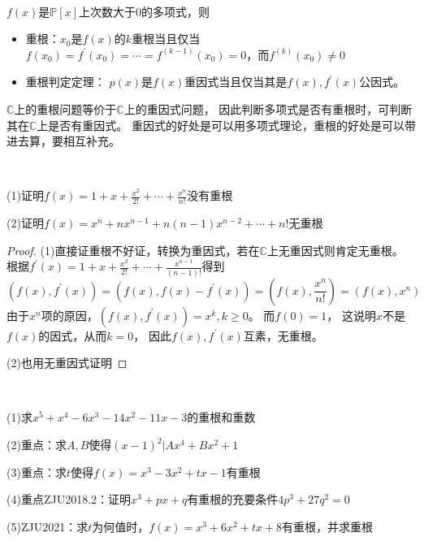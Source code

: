 ~

\begin{theorem}[重根性质汇总]
  $f(x)$是$\mathbb{P}[x]$上次数大于$0$的多项式，则
  \begin{itemize}
  \item 重根：$x_0$是$f(x)$的$k$重根当且仅当$f(x_0) = f^{\prime}(x_0) = \cdots = f^{(k-1)}(x_0) = 0$，而$f^{(k)}(x_0) \neq 0$
  \item 重根判定定理：
    $p(x)$是$f(x)$重因式当且仅当其是$f(x),f^{\prime}(x)$公因式。
  \end{itemize}
\end{theorem}

\begin{note}
  $\mathbb{C}$上的重根问题等价于$\mathbb{C}$上的重因式问题，
  因此判断多项式是否有重根时，可判断其在$\mathbb{C}$上是否有重因式。
  重因式的好处是可以用多项式理论，重根的好处是可以带进去算，要相互补充。
\end{note}



~

\begin{exercise}[判定重根存在性]
  (1)证明$f(x) = 1 + x + \frac{x^2}{2!} + \cdots + \frac{x^n}{n!}$没有重根

  (2)证明$f(x) = x^n + nx^{n-1} + n(n-1)x^{n-2} + \cdots + n!$无重根
\end{exercise}

\begin{proof}
  (1)直接证重根不好证，转换为重因式，若在$\mathbb{C}$上无重因式则肯定无重根。
  根据$f^{\prime}(x) = 1 + x + \frac{x^2}{2!} + \cdots + \frac{x^{n-1}}{(n-1)!}$得到
  \begin{equation*}
    (f(x),f^{\prime}(x)) = (f(x),f(x) - f^{\prime}(x)) = (f(x),\frac{x^n}{n!}) = (f(x),x^n) 
  \end{equation*}
  由于$x^n$项的原因，$(f(x),f^{\prime}(x)) = x^k, k \geq 0$。
  而$f(0) = 1$，
  这说明$x$不是$f(x)$的因式，从而$k = 0$，
  因此$f(x),f^{\prime}(x)$互素，无重根。

  (2)也用无重因式证明
\end{proof}



~

\begin{exercise}[重根、重因式相互转化]
  (1)求$x^5 + x^4 - 6x^3 - 14 x^2 - 11 x - 3$的重根和重数

  (2)重点：求$A,B$使得$(x - 1)^2 | Ax^4 + Bx^2 + 1$

  (3)重点：求$t$使得$f(x) = x^3 - 3x^2 + tx - 1$有重根

  (4)重点ZJU2018.2：证明$x^3 + px + q$有重根的充要条件$4p^3 + 27q^2 = 0$

  (5)ZJU2021：求$t$为何值时，$f(x) = x^3 + 6x^2 + tx + 8$有重根，并求重根
\end{exercise}

